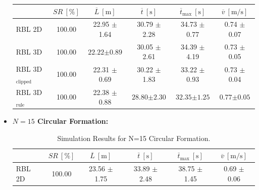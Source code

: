 \begin{itemize}
\begin{table}[H]
                \label{n_10_circ}
                \centering
                \renewcommand{\arraystretch}{1.2}
                \begin{tabular}{|l|c|c|c|c|c|}
                \hline
                                            & \( SR \ [\%] \) & \( \overline{L} \ [\mathrm{m}] \) & \( \overline{t} \ [\mathrm{s}] \) & \( \overline{t}_{\text{max}} \ [\mathrm{s}] \) & \( \overline{v} \ [\mathrm{m/s}] \)     \\ \hline
                RBL 2D                      & 100.00          & 22.95 $\pm$ 1.64                  & 30.79 $\pm$ 2.28                  & 34.73 $\pm$ 0.77                               & 0.74 $\pm$ 0.07                         \\ \hline
                RBL 3D                      & 100.00          & $\mathbf{22.22} \boldsymbol{\pm} \mathbf{0.89}$                  & 30.05 $\pm$ 2.61                  & 34.39 $\pm$ 4.19                               & 0.73 $\pm$ 0.05                         \\ \hline
                RBL 3D\(_{\text{clipped}}\) & 100.00          & 22.31 $\pm$ 0.69                  & 30.22 $\pm$ 1.83                  & 33.22 $\pm$ 0.93                               & 0.73 $\pm$ 0.04                         \\ \hline
                RBL 3D\(_{\text{rule}}\)                & 100.00          & 22.38 $\pm$ 0.88                  & $\mathbf{28.80} \boldsymbol{\pm} \mathbf{2.30}$                  & $\mathbf{32.35} \boldsymbol{\pm} \mathbf{1.25}$                               & $\mathbf{0.77} \boldsymbol{\pm} \mathbf{0.05}$                         \\ \hline
                \end{tabular}
            \end{table}
        \item \textbf{$N = 15$ Circular Formation:}
            \begin{table}[H]
                \caption{Simulation Results for N=15 Circular Formation.}
                \label{n_15_circ}
                \centering
                \renewcommand{\arraystretch}{1.2}
                \begin{tabular}{|l|c|c|c|c|c|}
                \hline
                                            & \( SR \ [\%] \) & \( \overline{L} \ [\mathrm{m}] \) & \( \overline{t} \ [\mathrm{s}] \) & \( \overline{t}_{\text{max}} \ [\mathrm{s}] \) & \( \overline{v} \ [\mathrm{m/s}] \)     \\ \hline
                RBL 2D                      & 100.00          & 23.56 $\pm$ 1.75                  & 33.89 $\pm$ 2.48                  & 38.75 $\pm$ 1.45                               & 0.69 $\pm$ 0.06                         \\ \hline

\end{tabular}
\end{table}
\end{itemize}
